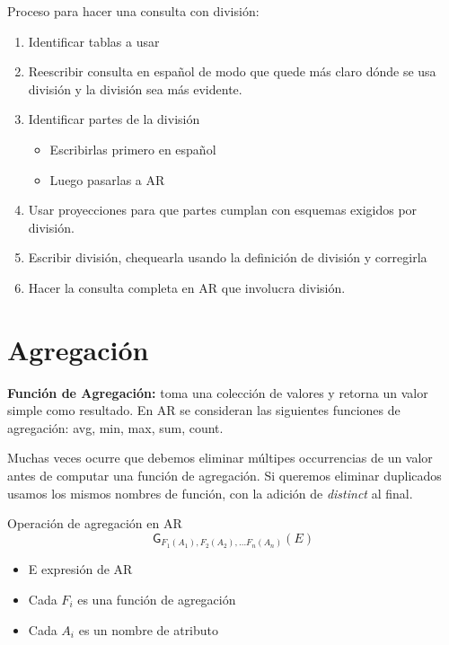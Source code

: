 \documentclass[12pt,a4paper]{report}
\begin{document}
		\par Proceso para hacer una consulta con división:
		\begin{enumerate}
			\item Identificar tablas a usar
			\item Reescribir consulta en español de modo que quede más claro dónde se usa división y la división sea más evidente.
			\item Identificar partes de la división
			\begin{itemize}
				\item Escribirlas primero en español
				\item Luego pasarlas a AR
			\end{itemize}
			\item Usar proyecciones para que partes cumplan con esquemas exigidos por división.
			\item Escribir división, chequearla usando la definición de división y corregirla
			\item Hacer la consulta completa en AR que involucra división.
		\end{enumerate}
	
	\section{Agregación}
		\par \textbf{Función de Agregación:} toma una colección de valores y retorna un valor simple como resultado. En AR se consideran las siguientes funciones de agregación: avg, min, max, sum, count.
		\par Muchas veces ocurre que debemos eliminar múltipes occurrencias de un valor antes de computar una función de agregación. Si queremos eliminar duplicados usamos los mismos nombres de función, con la adición de \textit{distinct} al final.
		\vspace{5mm}		
		\par Operación de agregación en AR
		\[\mathsf{G}_{F_{1}(A_{1}), F_{2}(A_{2}), \dotsc F_{n}(A_{n})}(E)\]
		\begin{itemize}
			\item E expresión de AR
			\item Cada $F_{i}$ es una función de agregación
			\item Cada $A_{i}$ es un nombre de atributo
		\end{itemize}
\end{document}
